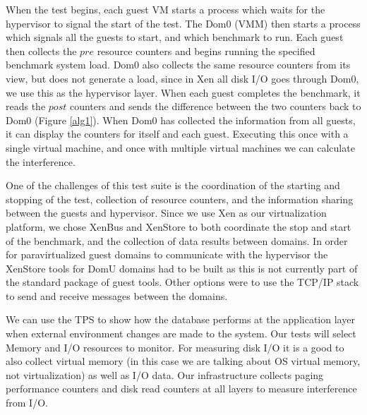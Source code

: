 When the test begins, each guest VM starts a process which waits for the hypervisor to signal the start of the test.  
 The Dom0 (VMM) then starts a process which signals all the guests to start, and which benchmark to run.  
 Each guest then collects the $pre$ resource counters and begins running the specified benchmark system load.  
 Dom0 also collects the same resource counters from its view, but does not generate a load, since in Xen all disk I/O goes through Dom0, we use this as the hypervisor layer.  
 When each guest completes the benchmark, it reads the $post$ counters and sends the difference between the two counters back to Dom0 (Figure \ref{alg1}).
 When Dom0 has collected the information from all guests, it can display the counters for itself and each guest.
 Executing this once with a single virtual machine, and once with multiple virtual machines we can calculate the interference.

One of the challenges of this test suite is the coordination of the starting and stopping of the test, collection of resource counters, and the information sharing between the guests and hypervisor.  
Since we use Xen as our virtualization platform, we chose XenBus and XenStore \cite{xenbus} to both coordinate the stop and start of the benchmark, and the collection of data results between domains.
In order for paravirtualized guest domains to communicate with the hypervisor the XenStore tools for DomU domains had to be built as this is not currently part of the standard package of guest tools.  Other options were to use the TCP/IP stack to send and receive messages between the domains.


We can use the TPS to show how the database performs at the application layer when external environment changes are made to the system.  Our tests will select Memory and I/O resources to monitor.  For measuring disk I/O it is a good to also collect virtual memory (in this case we are talking about OS virtual memory, not virtualization) as well as I/O data.  Our infrastructure collects paging performance counters and disk read counters at all layers to measure interference from I/O. 

